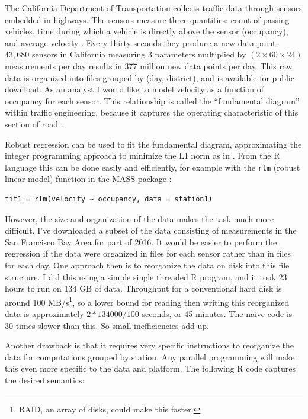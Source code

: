 \documentclass[12pt]{article}
\begin{document}
The California Department of Transportation collects traffic data through
sensors embedded in highways. The sensors measure three quantities: count
of passing vehicles, time during which a vehicle is directly above the
sensor (occupancy), and average velocity \cite{jia2001pems}.  Every thirty
seconds they produce a new data point. $43,680$ sensors in California
measuring 3 parameters multiplied by $(2 \times 60 \times 24)$ measurements
per day results in 377 million new data points per day.  This raw data is
organized into files grouped by (day, district), and is available for
public download.  As an analyst I would like to model velocity as a
function of occupancy for each sensor. This relationship is called the
``fundamental diagram'' within traffic engineering, because it captures the
operating characteristic of this section of road
\cite{daganzo1997fundamentals}.

Robust regression can be used to fit the fundamental diagram, approximating
the integer programming approach to minimize the L1 norm as in
\cite{li2011fundamental}.  From the R language this can be done easily and
efficiently, for example with the \texttt{rlm} (robust linear model)
function in the MASS package \cite{venables2013modern}:

\begin{verbatim}
fit1 = rlm(velocity ~ occupancy, data = station1)
\end{verbatim}

However, the size and organization of the data makes the task much more
difficult.  I've downloaded a subset of the data consisting of measurements
in the San Francisco Bay Area for part of 2016.  It would be easier to
perform the regression if the data were organized in files for each sensor
rather than in files for each day.  One approach then is to reorganize the
data on disk into this file structure. I did this using a simple single
threaded R program, and it took 23 hours to run on 134 GB of data.
Throughput for a conventional hard disk is around 100 MB/s\footnote{RAID,
an array of disks, could make this faster.}, so a lower bound for reading
then writing this reorganized data is approximately $2 * 134000 / 100$
seconds, or 45 minutes. The naive code is 30 times slower than this. So
small inefficiencies add up.

Another drawback is that it requires very specific instructions to
reorganize the data for computations grouped by station. Any parallel
programming will make this even more specific to the data and platform. The
following R code captures the desired semantics:
\end{document}
